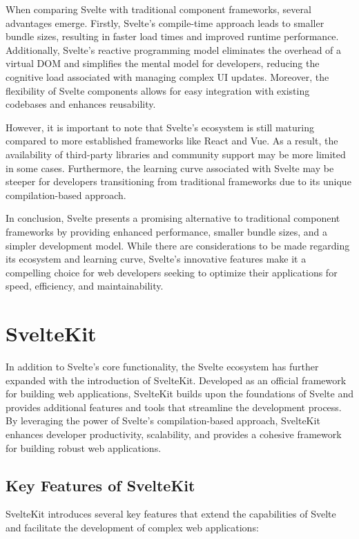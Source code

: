 When comparing Svelte with traditional component frameworks, several advantages emerge. Firstly, Svelte's compile-time approach leads to smaller bundle sizes, resulting in faster load times and improved runtime performance. Additionally, Svelte's reactive programming model eliminates the overhead of a virtual DOM and simplifies the mental model for developers, reducing the cognitive load associated with managing complex UI updates. Moreover, the flexibility of Svelte components allows for easy integration with existing codebases and enhances reusability.

However, it is important to note that Svelte's ecosystem is still maturing compared to more established frameworks like React and Vue. As a result, the availability of third-party libraries and community support may be more limited in some cases. Furthermore, the learning curve associated with Svelte may be steeper for developers transitioning from traditional frameworks due to its unique compilation-based approach.

In conclusion, Svelte presents a promising alternative to traditional component frameworks by providing enhanced performance, smaller bundle sizes, and a simpler development model. While there are considerations to be made regarding its ecosystem and learning curve, Svelte's innovative features make it a compelling choice for web developers seeking to optimize their applications for speed, efficiency, and maintainability.

\section{SvelteKit}
\label{sec:sveltekit}

In addition to Svelte's core functionality, the Svelte ecosystem has further expanded with the introduction of SvelteKit. Developed as an official framework for building web applications, SvelteKit builds upon the foundations of Svelte and provides additional features and tools that streamline the development process. By leveraging the power of Svelte's compilation-based approach, SvelteKit enhances developer productivity, scalability, and provides a cohesive framework for building robust web applications.

\subsection{Key Features of SvelteKit}

SvelteKit introduces several key features that extend the capabilities of Svelte and facilitate the development of complex web applications:

